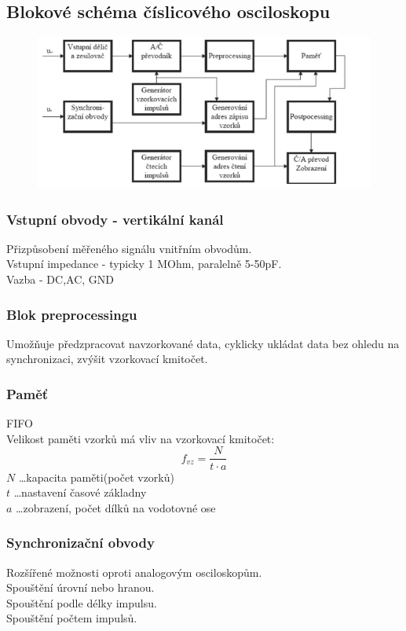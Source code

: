 \subsection*{Blokové schéma číslicového osciloskopu}
\begin{figure}[H]
    \includegraphics*[scale = 1]{images/osciloskopSchema2.png}
\end{figure}

\subsubsection*{Vstupní obvody - vertikální kanál}
Přizpůsobení měřeného signálu vnitřním obvodům.\\
Vstupní impedance - typicky 1 MOhm, paralelně 5-50pF.\\
Vazba - DC,AC, GND

\subsubsection*{Blok preprocessingu}
Umožňuje předzpracovat navzorkované data, cyklicky ukládat data bez ohledu na synchronizaci, zvýšit vzorkovací kmitočet. \\
\subsubsection*{Paměť}
FIFO\\
Velikost paměti vzorků má vliv na vzorkovací kmitočet:
\begin{equation}
    f_{vz} = \frac{N}{t \cdot a} 
\end{equation}
$N$ \dots kapacita paměti(počet vzorků)\\
$t$ \dots nastavení časové základny\\
$a$ \dots zobrazení, počet dílků na vodotovné ose\\

\subsubsection*{Synchronizační obvody}
Rozšířené možnosti oproti analogovým osciloskopům.\\
Spouštění úrovní nebo hranou.\\
Spouštění podle délky impulsu.\\
Spouštění počtem impulsů.\\

